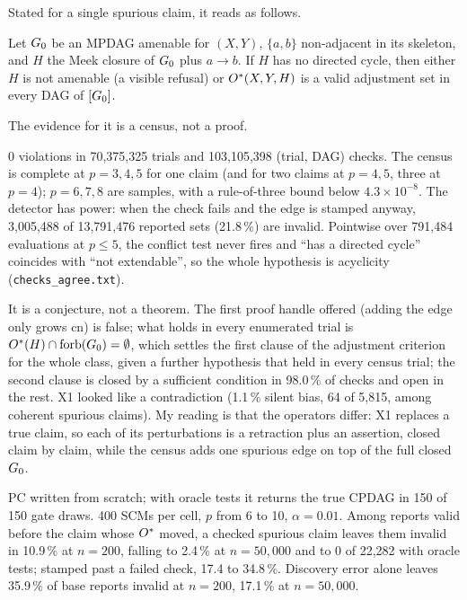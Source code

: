 Stated for a single spurious claim, it reads as follows.

\begin{formulabox}
Let $G_0$ be an MPDAG amenable for $(X,Y)$, $\{a,b\}$ non-adjacent in its skeleton, and $H$ the Meek
closure of $G_0$ plus $a \to b$. If $H$ has no directed cycle, then either $H$ is not amenable (a
visible refusal) or $O^{*}(X,Y,H)$ is a valid adjustment set in every DAG of $[G_0]$.
\end{formulabox}

The evidence for it is a census, not a proof.

\begin{medido}
0 violations in 70,375,325 trials and 103,105,398 (trial, DAG) checks. The census is complete at
$p = 3, 4, 5$ for one claim (and for two claims at $p = 4, 5$, three at $p = 4$); $p = 6, 7, 8$ are
samples, with a rule-of-three bound below $4.3 \times 10^{-8}$. The detector has power: when the
check fails and the edge is stamped anyway, 3,005,488 of 13,791,476 reported sets (21.8\,\%) are
invalid. Pointwise over 791,484 evaluations at $p \le 5$, the conflict test never fires and
``has a directed cycle'' coincides with ``not extendable'', so the whole hypothesis is acyclicity
(\texttt{checks\_agree.txt}).
\end{medido}

It is a conjecture, not a theorem. The first proof handle offered (adding the edge only grows
$\mathrm{cn}$) is false; what holds in every enumerated trial is $O^{*}(H) \cap \mathrm{forb}(G_0) = \emptyset$, which settles the first clause of the adjustment
criterion for the whole class, given a further hypothesis that held in every census trial; the second clause is closed by a sufficient condition in 98.0\,\% of
checks and open in the rest. X1 looked like a contradiction (1.1\,\% silent bias, 64 of 5,815, among
coherent spurious claims). My reading is that the operators differ: X1 replaces a true claim, so each
of its perturbations is a retraction plus an assertion, closed claim by claim, while the census adds
one spurious edge on top of the full closed $G_0$.

\begin{medido}
PC written from scratch; with oracle tests it returns the true CPDAG in 150 of 150 gate draws. 400
SCMs per cell, $p$ from 6 to 10, $\alpha = 0.01$. Among reports valid before the claim whose $O^{*}$
moved, a checked spurious claim leaves them invalid in 10.9\,\% at $n = 200$, falling to 2.4\,\% at
$n = 50{,}000$ and to 0 of 22,282 with oracle tests; stamped past a failed check, 17.4 to 34.8\,\%.
Discovery error alone leaves 35.9\,\% of base reports invalid at $n = 200$, 17.1\,\% at $n = 50{,}000$.
\end{medido}

